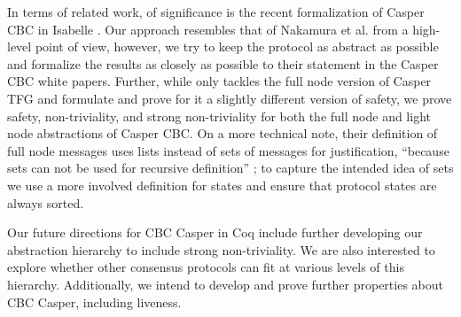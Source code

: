 In terms of related work, of significance is the recent formalization of Casper CBC in Isabelle \cite{Nakamura}.
Our approach resembles that of Nakamura et al. from a high-level point of view, however, we try to keep the protocol as abstract as possible and formalize the results as closely as possible to their statement in the Casper CBC white papers.
Further, while \cite{Nakamura} only tackles the full node version of Casper TFG and formulate and prove for it a slightly different version of safety, we prove safety, non-triviality, and strong non-triviality for both the full node and light node abstractions of Casper CBC.
On a more technical note, their definition of full node messages uses lists instead of sets of messages for justification, ``because sets can not be used for recursive definition'' \cite{Nakamura-github}; to capture the intended idea of sets we use a more involved definition for states and ensure that protocol states are always sorted.

Our future directions for CBC Casper in Coq include further developing our abstraction hierarchy to include strong non-triviality. We are also interested to explore whether other consensus protocols can fit at various levels of this hierarchy. Additionally, we intend to develop and prove further properties about CBC Casper, including liveness. 